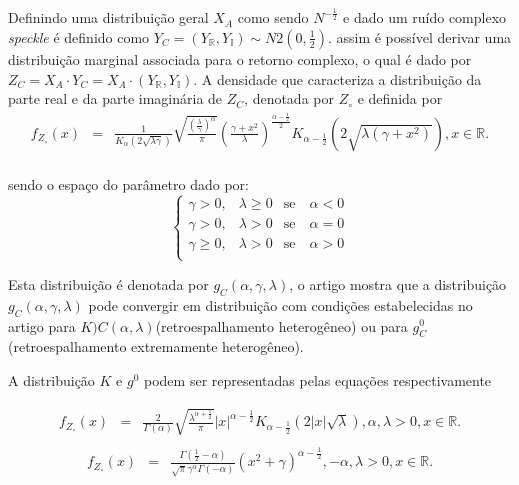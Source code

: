 \documentclass[12pt,a4paper]{article}
\begin{document}
Definindo uma distribuição geral $X_{A}$ como sendo $N^{-\frac{1}{2}}$ e dado um ruído complexo {\it speckle} é definido como $Y_{C}=(Y_{\mathbb{R}},Y_{\mathbb{I}})\sim N2(0,\frac{1}{2})$. assim é possível derivar uma distribuição marginal associada para o retorno complexo, o qual é dado por $Z_{C}=X_{A}\cdot Y_{C}=X_{
A}\cdot(Y_{\mathbb{R}},Y_{\mathbb{I}})$. A densidade que caracteriza a distribuição da parte real e da parte imaginária de $Z_{C}$, denotada por $Z_{\circ}$ e definida por
\begin{equation}\label{sec63eqn1}
\begin{array}{ccc}
	f_{Z_{\circ}}(x)&=&\frac{1}{K_{\alpha}(2\sqrt{\lambda\gamma})}\sqrt{\frac{\left(\frac{\lambda}{\gamma} \right)^{\alpha}}{\pi}}\left(\frac{\gamma+x^2}{\lambda} \right)^{\frac{\alpha-\frac{1}{2}}{2}}K_{\alpha-\frac{1}{2}}\left(2\sqrt{\lambda(\gamma+x^2)}\right), x\in\mathbb{R}. \\
\end{array}
\end{equation}

sendo o espaço do parâmetro dado por:
\begin{equation}\label{sec63eqn2}
	\left\{
\begin{array}{ccr}
	\gamma>0,&\lambda\geq 0&\mbox{se}\quad\alpha<0 \\
	\gamma>0,&\lambda > 0&\mbox{se}\quad\alpha=0 \\
	\gamma\geq0,&\lambda> 0&\mbox{se}\quad\alpha>0 \\
\end{array}
\right.
\end{equation}

Esta distribuição é denotada por $g_{C}(\alpha,\gamma,\lambda)$, o artigo mostra que a distribuição $g_{C}(\alpha,\gamma,\lambda)$ pode convergir em distribuição com condições estabelecidas no artigo para $K){C}(\alpha,\lambda)$(retroespalhamento heterogêneo) ou para $g_{C}^{0}$ (retroespalhamento extremamente heterogêneo).

A distribuição $K$ e $g^0$ podem ser representadas pelas equações respectivamente

\begin{equation}\label{sec63eqn3}
\begin{array}{ccc}
	f_{Z_{\circ}}(x)&=&\frac{2}{\Gamma(\alpha)}\sqrt{\frac{\lambda^{\alpha+\frac{1}{2}}}{\pi}} |x|^{\alpha-\frac{1}{2}}K_{\alpha-\frac{1}{2}}(2|x|\sqrt{\lambda}), \alpha,\lambda>0, x\in\mathbb{R}. \\
\end{array}
\end{equation}
\begin{equation}\label{sec63eqn4}
\begin{array}{ccc}
	f_{Z_{\circ}}(x)&=&\frac{\Gamma(\frac{1}{2}-\alpha)}{\sqrt{\pi}\gamma^{\alpha}\Gamma(-\alpha)}\left(x^2+\gamma\right)^{\alpha-\frac{1}{2}}, -\alpha,\lambda>0, x\in\mathbb{R}. \\
\end{array}
\end{equation}
\end{document}
